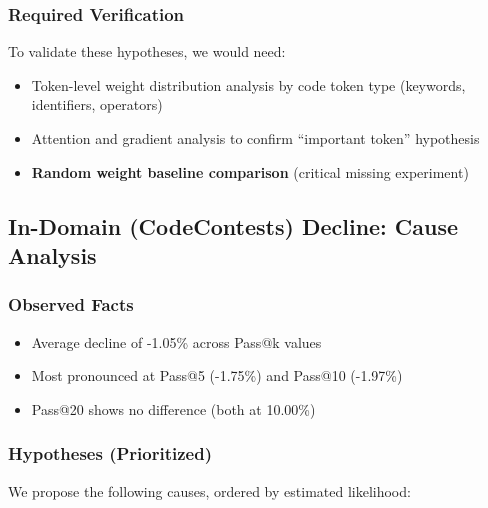 \subsubsection{Required Verification}

To validate these hypotheses, we would need:
\begin{itemize}[nosep]
    \item Token-level weight distribution analysis by code token type (keywords, identifiers, operators)
    \item Attention and gradient analysis to confirm ``important token'' hypothesis
    \item \textbf{Random weight baseline comparison} (critical missing experiment)
\end{itemize}

\subsection{In-Domain (CodeContests) Decline: Cause Analysis}

\subsubsection{Observed Facts}

\begin{itemize}[nosep]
    \item Average decline of -1.05\% across Pass@k values
    \item Most pronounced at Pass@5 (-1.75\%) and Pass@10 (-1.97\%)
    \item Pass@20 shows no difference (both at 10.00\%)
\end{itemize}

\subsubsection{Hypotheses (Prioritized)}

We propose the following causes, ordered by estimated likelihood:

